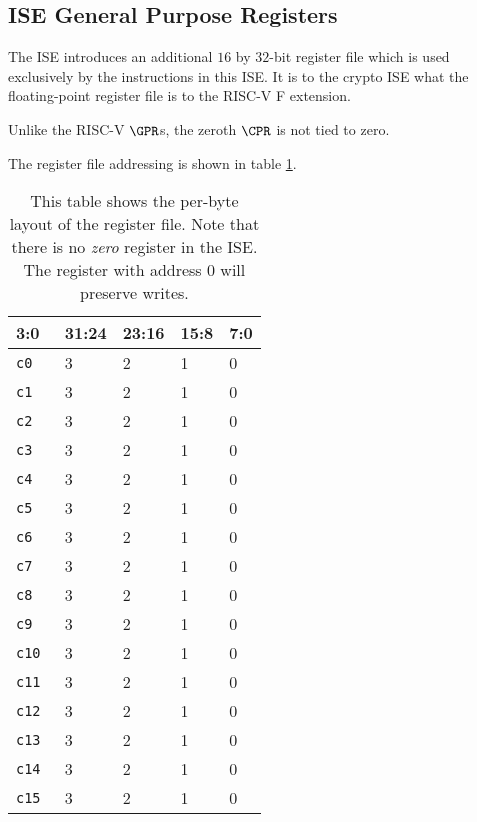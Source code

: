 
\subsection{ISE General Purpose Registers}

The ISE introduces an additional $16$ by $32$-bit register file which
is used exclusively by the instructions in this ISE.
It is to the crypto ISE what the floating-point register file is to the
RISC-V F extension.

Unlike the RISC-V $\GPR$s, the zeroth $\CPR$ is not tied to zero.

The register file addressing is shown in table \ref{tab:state-addr}.

\begin{table}[h!]
\centering
\begin{tabular}{|l|l l l l|}
\hline
\multicolumn{1}{|l|}{3:0} & \textbf{31:24} & \textbf{23:16} & \textbf{15:8} & \textbf{7:0} \\ \hline
{\tt c0  } & 3 & 2 & 1 & 0      \\ \hline
{\tt c1  } & 3 & 2 & 1 & 0      \\ \hline
{\tt c2  } & 3 & 2 & 1 & 0      \\ \hline
{\tt c3  } & 3 & 2 & 1 & 0      \\ \hline
{\tt c4  } & 3 & 2 & 1 & 0      \\ \hline
{\tt c5  } & 3 & 2 & 1 & 0      \\ \hline
{\tt c6  } & 3 & 2 & 1 & 0      \\ \hline
{\tt c7  } & 3 & 2 & 1 & 0      \\ \hline
{\tt c8  } & 3 & 2 & 1 & 0      \\ \hline
{\tt c9  } & 3 & 2 & 1 & 0      \\ \hline
{\tt c10 } & 3 & 2 & 1 & 0      \\ \hline
{\tt c11 } & 3 & 2 & 1 & 0      \\ \hline
{\tt c12 } & 3 & 2 & 1 & 0      \\ \hline
{\tt c13 } & 3 & 2 & 1 & 0      \\ \hline
{\tt c14 } & 3 & 2 & 1 & 0      \\ \hline
{\tt c15 } & 3 & 2 & 1 & 0      \\ \hline
\end{tabular}
\caption{This table shows the per-byte layout of the register file.
Note that there is no {\em zero} register in the ISE.
The register with address $0$ will preserve writes.}
\label{tab:state-addr}
\end{table}

